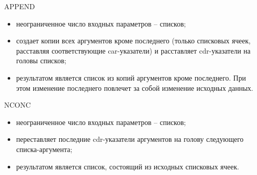 \documentclass[14pt,a4paper]{scrreprt}
\begin{document}
APPEND
\begin{itemize}
	\item неограниченное число входных параметров -- списков;
	\item создает копии всех аргументов кроме последнего (только списковых ячеек, расставляя соответствующие car-указатели) и расставляет cdr-указатели на головы списков;
	\item результатом является список из копий аргументов кроме последнего. При этом изменение последнего повлечет за собой изменение исходных данных.
\end{itemize}

NCONC
\begin{itemize}
	\item неограниченное число входных параметров -- списков;
	\item переставляет последние cdr-указатели аргументов на голову следующего списка-аргумента;
	\item результатом является список, состоящий из исходных списковых ячеек.
\end{itemize}
\end{document}
